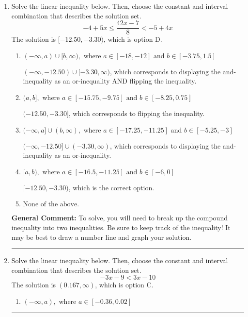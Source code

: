 \documentclass{extbook}[14pt]
\newcommand{\litem}[1]{\item #1

\rule{\textwidth}{0.4pt}}
\begin{document}
\begin{enumerate}
{\begin{enumerate}[label=\Alph*.]
Corresponds to including the endpoints (when they should be excluded).
\item \( (-\infty, a) \cup (b, \infty), \text{ where } a \in [1.5, 6] \text{ and } b \in [2.25, 6] \)

Corresponds to inverting the inequality and negating the solution.
\item \( (-\infty, a) \cup (b, \infty), \text{ where } a \in [-11.25, -2.25] \text{ and } b \in [-6, -2.25] \)

 * Correct option.
\item \( (-\infty, \infty) \)

Corresponds to the variable canceling, which does not happen in this instance.
\end{enumerate}

\textbf{General Comment:} When multiplying or dividing by a negative, flip the sign.
}
\litem{
Solve the linear inequality below. Then, choose the constant and interval combination that describes the solution set.
\[ -4 + 5 x \leq \frac{42 x - 7}{8} < -5 + 4 x \]The solution is \( [-12.50, -3.30) \), which is option D.\begin{enumerate}[label=\Alph*.]
\item \( (-\infty, a) \cup [b, \infty), \text{ where } a \in [-18, -12] \text{ and } b \in [-3.75, 1.5] \)

$(-\infty, -12.50) \cup [-3.30, \infty)$, which corresponds to displaying the and-inequality as an or-inequality AND flipping the inequality.
\item \( (a, b], \text{ where } a \in [-15.75, -9.75] \text{ and } b \in [-8.25, 0.75] \)

$(-12.50, -3.30]$, which corresponds to flipping the inequality.
\item \( (-\infty, a] \cup (b, \infty), \text{ where } a \in [-17.25, -11.25] \text{ and } b \in [-5.25, -3] \)

$(-\infty, -12.50] \cup (-3.30, \infty)$, which corresponds to displaying the and-inequality as an or-inequality.
\item \( [a, b), \text{ where } a \in [-16.5, -11.25] \text{ and } b \in [-6, 0] \)

$[-12.50, -3.30)$, which is the correct option.
\item \( \text{None of the above.} \)


\end{enumerate}

\textbf{General Comment:} To solve, you will need to break up the compound inequality into two inequalities. Be sure to keep track of the inequality! It may be best to draw a number line and graph your solution.
}
\litem{
Solve the linear inequality below. Then, choose the constant and interval combination that describes the solution set.
\[ -3x -9 < 3x -10 \]The solution is \( (0.167, \infty) \), which is option C.\begin{enumerate}[label=\Alph*.]
\item \( (-\infty, a), \text{ where } a \in [-0.36, 0.02] \)


\end{enumerate}}
\end{enumerate}
\end{document}

